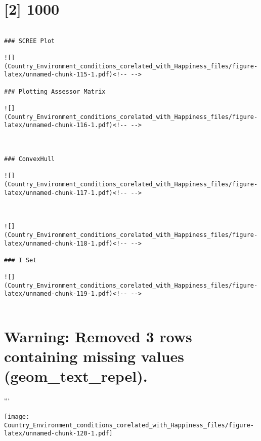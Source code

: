 \documentclass[]{book}
\begin{document}
\hypertarget{section}{%
\section{{[}2{]} 1000}\label{section}}

\begin{verbatim}

### SCREE Plot

![](Country_Environment_conditions_corelated_with_Happiness_files/figure-latex/unnamed-chunk-115-1.pdf)<!-- --> 

### Plotting Assessor Matrix

![](Country_Environment_conditions_corelated_with_Happiness_files/figure-latex/unnamed-chunk-116-1.pdf)<!-- --> 



### ConvexHull

![](Country_Environment_conditions_corelated_with_Happiness_files/figure-latex/unnamed-chunk-117-1.pdf)<!-- --> 



![](Country_Environment_conditions_corelated_with_Happiness_files/figure-latex/unnamed-chunk-118-1.pdf)<!-- --> 

### I Set

![](Country_Environment_conditions_corelated_with_Happiness_files/figure-latex/unnamed-chunk-119-1.pdf)<!-- --> 


\end{verbatim}

\hypertarget{warning-removed-3-rows-containing-missing-values-geom_text_repel.}{%
\section{Warning: Removed 3 rows containing missing values
(geom\_text\_repel).}\label{warning-removed-3-rows-containing-missing-values-geom_text_repel.}}

```

\texttt{[image: Country\_Environment\_conditions\_corelated\_with\_Happiness\_files/figure-latex/unnamed-chunk-120-1.pdf]}


\end{document}
